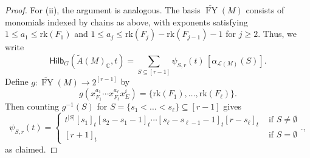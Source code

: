 \documentclass[10pt,a4paper]{amsart}
\newcommand{\FY}{\operatorname{FY}}
\newcommand{\Hilb}{{\mathsf{Hilb}}}
\renewcommand{\L}{{\mathcal{L}}}
\newcommand{\rk}{{\mathrm{rk}}}
\begin{document}
\begin{proof}
For (ii), the argument is analogous. The basis $\widetilde{\FY}(M)$ consists of monomials indexed by chains as above, with exponents satisfying
$1\le a_1\le \rk(F_1)$ and $1\le a_j\le \rk(F_j)-\rk(F_{j-1})-1$ for $j\ge 2$. 
Thus, we write
\[
\Hilb_G(\widetilde{A}(M)_{\mathbb{C}},t)
=\sum_{S\subseteq [r-1]} \psi_{S,r}(t)\,[\alpha_{\L(M)}(S)].
\]
Define $g:\widetilde{\FY}(M)\longrightarrow 2^{[r-1]}$ by
\[
g(x_{F_1}^{a_1}\cdots x_{F_\ell}^{a_\ell}x_E^i)
=\{\rk(F_1),\ldots,\rk(F_\ell)\}.
\]
Then counting $g^{-1}(S)$ for $S=\{s_1<\ldots<s_{\ell}\}\subseteq [r-1]$ gives 
\[
    \psi_{S,r}(t)=\begin{cases}
        t^{|S|}[s_1]_t[s_2-s_1-1]_t\cdots[s_{\ell}-s_{\ell-1}-1]_t[r-s_{\ell}]_t & \text{ if }S\neq \emptyset\\
        [r+1]_t & \text{ if } S=\emptyset
    \end{cases}.,
\]
as claimed.
\end{proof}
\end{document}
